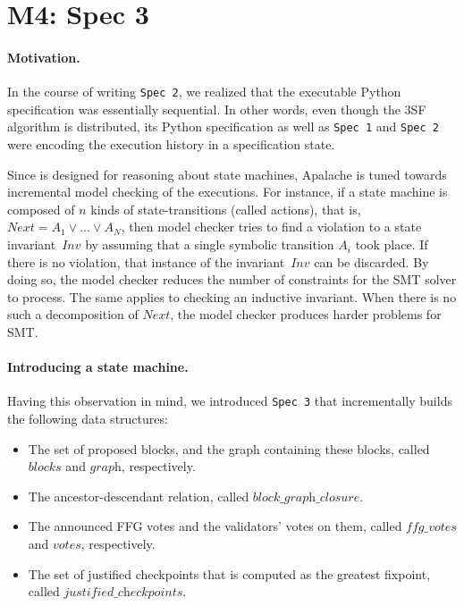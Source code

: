 
\section{M4: Spec 3}

\paragraph{Motivation.} In the course of writing \texttt{Spec 2}, we realized
that the executable Python specification was essentially sequential. In other
words, even though the 3SF algorithm is distributed, its Python
specification as well as \texttt{Spec 1} and \texttt{Spec 2} were encoding the
execution history in a specification state.

Since \tlap{} is designed for reasoning about state machines, Apalache is tuned
towards incremental model checking of the executions. For instance, if a state
machine is composed of $n$ kinds of state-transitions (called actions), that
is, $\mathit{Next} = A_1 \vee \dots \vee A_N$, then model checker tries to find
a violation to a state invariant~$\textit{Inv}$ by assuming that a single
symbolic transition $A_i$ took place. If there is no violation, that instance
of the invariant~$\textit{Inv}$ can be discarded. By doing so, the model
checker reduces the number of constraints for the SMT solver to process.  The
same applies to checking an inductive invariant. When there is no such a
decomposition of $\mathit{Next}$, the model checker produces harder problems
for SMT\@.

\paragraph{Introducing a state machine.} Having this observation in mind, we
introduced \texttt{Spec 3} that incrementally builds the following data structures:

\begin{itemize}

    \item The set of proposed blocks, and the graph containing these blocks,
        called $\textit{blocks}$ and $\textit{graph}$, respectively.

    \item The ancestor-descendant relation, called
        $\textit{block\_graph\_closure}$.

    \item The announced FFG votes and the validators' votes on them, called
        $\textit{ffg\_votes}$ and $\textit{votes}$, respectively.

    \item The set of justified checkpoints that is computed as the greatest
        fixpoint, called $\textit{justified\_checkpoints}$.

\end{itemize}

